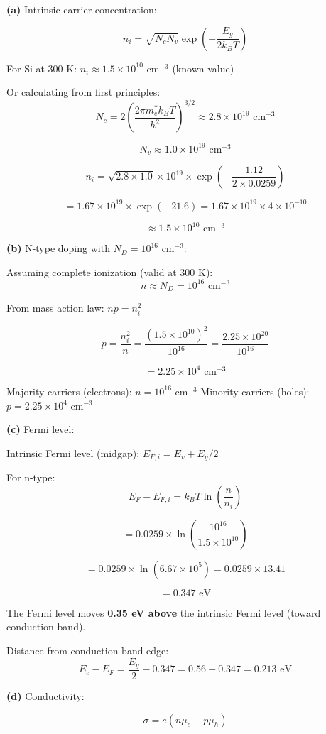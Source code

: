 \documentclass[12pt,a4paper]{article}
\begin{document}
\begin{solution}
\textbf{(a)} Intrinsic carrier concentration:

$$n_i = \sqrt{N_c N_v} \exp\left(-\frac{E_g}{2k_BT}\right)$$

For Si at 300 K: $n_i \approx 1.5 \times 10^{10}$ cm$^{-3}$ (known value)

Or calculating from first principles:
$$N_c = 2\left(\frac{2\pi m_e^* k_B T}{h^2}\right)^{3/2} \approx 2.8 \times 10^{19}\text{ cm}^{-3}$$

$$N_v \approx 1.0 \times 10^{19}\text{ cm}^{-3}$$

$$n_i = \sqrt{2.8 \times 1.0} \times 10^{19} \times \exp\left(-\frac{1.12}{2 \times 0.0259}\right)$$

$$= 1.67 \times 10^{19} \times \exp(-21.6) = 1.67 \times 10^{19} \times 4 \times 10^{-10}$$

$$\approx 1.5 \times 10^{10}\text{ cm}^{-3}$$

\textbf{(b)} N-type doping with $N_D = 10^{16}$ cm$^{-3}$:

Assuming complete ionization (valid at 300 K):
$$n \approx N_D = 10^{16}\text{ cm}^{-3}$$

From mass action law: $np = n_i^2$

$$p = \frac{n_i^2}{n} = \frac{(1.5 \times 10^{10})^2}{10^{16}} = \frac{2.25 \times 10^{20}}{10^{16}}$$

$$= 2.25 \times 10^{4}\text{ cm}^{-3}$$

Majority carriers (electrons): $n = 10^{16}$ cm$^{-3}$
Minority carriers (holes): $p = 2.25 \times 10^{4}$ cm$^{-3}$

\textbf{(c)} Fermi level:

Intrinsic Fermi level (midgap): $E_{F,i} = E_v + E_g/2$

For n-type:
$$E_F - E_{F,i} = k_BT \ln\left(\frac{n}{n_i}\right)$$

$$= 0.0259 \times \ln\left(\frac{10^{16}}{1.5 \times 10^{10}}\right)$$

$$= 0.0259 \times \ln(6.67 \times 10^5) = 0.0259 \times 13.41$$

$$= 0.347\text{ eV}$$

The Fermi level moves \textbf{0.35 eV above} the intrinsic Fermi level (toward conduction band).

Distance from conduction band edge:
$$E_c - E_F = \frac{E_g}{2} - 0.347 = 0.56 - 0.347 = 0.213\text{ eV}$$

\textbf{(d)} Conductivity:

$$\sigma = e(n\mu_e + p\mu_h)$$


\end{solution}
\end{document}
